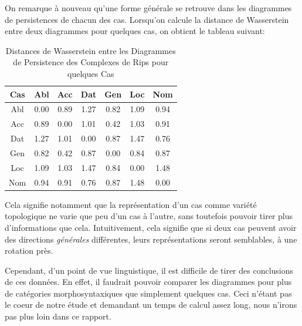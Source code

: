 \documentclass{cours}
\begin{document}
On remarque à nouveau qu'une forme générale se retrouve dans les diagrammes de persistences de chacun des cas.
Lorsqu'on calcule la distance de Wasserstein entre deux diagrammes pour quelques cas, on obtient le tableau suivant:

\begin{table}
\centering
\begin{tabular}{c|cccccc}
	\toprule
	Cas & Abl & Acc & Dat & Gen & Loc & Nom\\
	\midrule
	Abl & 0.00 & 0.89 & 1.27 & 0.82 & 1.09 & 0.94\\
	Acc & 0.89 & 0.00 & 1.01 & 0.42 & 1.03 & 0.91\\
	Dat & 1.27 & 1.01 & 0.00 & 0.87 & 1.47 & 0.76\\
	Gen & 0.82 & 0.42 & 0.87 & 0.00 & 0.84 & 0.87\\
	Loc & 1.09 & 1.03 & 1.47 & 0.84 & 0.00 & 1.48\\
	Nom & 0.94 & 0.91 & 0.76 & 0.87 & 1.48 & 0.00\\
	\bottomrule
\end{tabular}
\caption{Distances de Wasserstein entre les Diagrammes de Persistence des Complexes de Rips pour quelques Cas}
\label{tab_wass_rc}
\end{table}

Cela signifie notamment que la représentation d'un cas comme variété topologique ne varie que peu d'un cas à l'autre, sans toutefois pouvoir tirer plus d'informations que cela.
Intuitivement, cela signifie que si deux cas peuvent avoir des directions \textit{générales} différentes, leurs représentations seront semblables, à une rotation près.

Cependant, d'un point de vue linguistique, il est difficile de tirer des conclusions de ces données. En effet, il faudrait pouvoir comparer les diagrammes pour plus de catégories morphosyntaxiques que simplement quelques cas. Ceci n'étant pas le coeur de notre étude et demandant un temps de calcul assez long, nous n'irons pas plus loin dans ce rapport.
\end{document}
